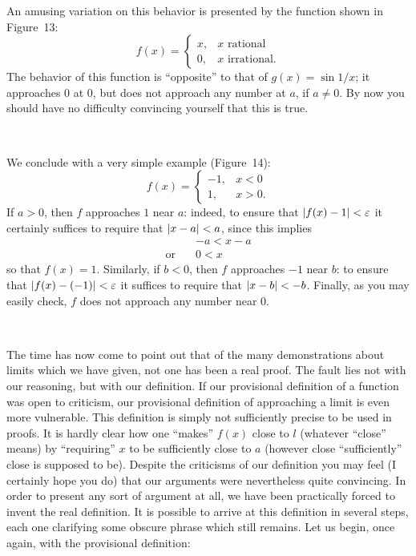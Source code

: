 An amusing variation on this behavior is presented by the function shown in
Figure~13:
\[
f(x)=\begin{cases}
x, & x\text{ rational}\\
0, & x\text{ irrational}.
\end{cases}
\]
The behavior of this function is ``opposite'' to that of $g(x)=\sin 1/x$; it
approaches $0$ at $0$, but does not approach any number at $a$, if $a\neq 0$.
By now you should have no difficulty convincing yourself that this is true.

\begin{center}
\\[0.6em]
\end{center}
We conclude with a very simple example (Figure~14):
\[
f(x)=\begin{cases}
-1, & x<0\\
1, & x>0.
\end{cases}
\]
If $a>0$, then $f$ approaches $1$ near $a$: indeed, to ensure that
$\lvert f(x)-1\rvert<\varepsilon$ it certainly suffices to require that
$\lvert x-a\rvert<a$, since this implies
\begin{align*}
&-a<x-a\\
\text{or}\quad &0<x
\end{align*}
so that $f(x)=1$. Similarly, if $b<0$, then $f$ approaches $-1$ near $b$: to
ensure that $\lvert f(x)-(-1)\rvert<\varepsilon$ it suffices to require that
$\lvert x-b\rvert<-b$. Finally, as you may easily check, $f$ does not approach any
number near $0$.

\begin{center}
\\[0.6em]
\end{center}
The time has now come to point out that of the many demonstrations about
limits which we have given, not one has been a real proof. The fault lies not
with our reasoning, but with our definition. If our provisional definition of
a function was open to criticism, our provisional definition of approaching a
limit is even more vulnerable. This definition is simply not sufficiently
precise to be used in proofs. It is hardly clear how one ``makes'' $f(x)$
close to $l$ (whatever ``close'' means) by ``requiring'' $x$ to be
sufficiently close to $a$ (however close ``sufficiently'' close is supposed to
be). Despite the criticisms of our definition you may feel (I certainly hope
you do) that our arguments were nevertheless quite convincing. In order to
present any sort of argument at all, we have been practically forced to invent
the real definition. It is possible to arrive at this definition in several
steps, each one clarifying some obscure phrase which still remains. Let us
begin, once again, with the provisional definition:

